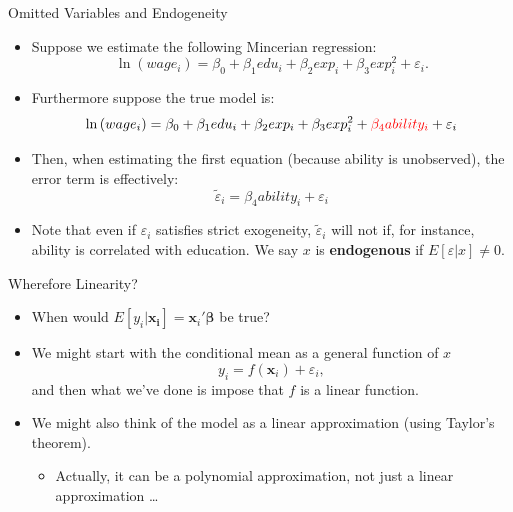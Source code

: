 \begin{frame}{Omitted Variables and Endogeneity}
\begin{itemize}
	\item Suppose we estimate the following Mincerian regression:\[
\ln \left(wage_{i}\right)=\beta_{0}+\beta_{1}edu_{i}+\beta_{2}exp_{i}+\beta_{3}exp_{i}^{2}+\varepsilon_{i}.
\]

	\item Furthermore suppose the true model is:\[
\ln \left(wage_{i}\right)=\beta_{0}+\beta_{1}edu_{i}+\beta_{2}exp_{i}+\beta_{3}exp_{i}^{2}+ \textcolor{red}{\beta_4 ability_{i}} + \varepsilon_{i}
\]

	\item Then, when estimating the first equation (because ability is unobserved), the error term is effectively:\[
	\widetilde{\varepsilon}_{i} = \beta_4 ability_{i} + \varepsilon_{i}
\]


\item Note that even if $\varepsilon_{i}$ satisfies strict exogeneity, $\widetilde{\varepsilon}_{i}$ will not
 	if, for instance, ability is correlated with education. We say $x$ is {\bf endogenous} if $E\left[\varepsilon|x\right]\ne 0$.


\end{itemize}
\end{frame}



\begin{frame}{Wherefore Linearity?}
\begin{itemize}
	\item When would $E\left[y_i|\boldsymbol{x_i}\right] = \boldsymbol{x}_i'\boldsymbol{\beta}$ be true?

	\medskip
	\item We might start with the conditional mean as a general function of $x$\[
	 y_{i} = f\left(\boldsymbol{x}_{i}\right)+\varepsilon_{i},
	\]
	and then what we've done is impose that $f$ is a linear function. 

		\medskip
	\item We might also think of the model as a linear approximation (using Taylor's theorem). 
	\begin{itemize}
		\item Actually, it can be a polynomial approximation, not just a linear approximation \dots
	\end{itemize}
\end{itemize}
\end{frame}

